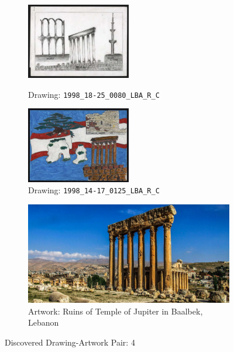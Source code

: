 \begin{figure}
     \centering
     \begin{subfigure}[b]{0.45\textwidth}
         \centering
         \includegraphics[width=0.5\textwidth]{images/new_discoveries/1998_18-25_0080_LBA_R_C.jpg}
         \caption{Drawing: \texttt{1998\_18-25\_0080\_LBA\_R\_C}}
         \label{fig:1998_18-25_0080_LBA_R_C}
         \includegraphics[width=0.5\textwidth]{images/new_discoveries/1998_14-17_0125_LBA_R_C.jpg}
         \caption{Drawing: \texttt{1998\_14-17\_0125\_LBA\_R\_C}}
         \label{fig:1998_14-17_0125_LBA_R_C}
     \end{subfigure}
     \hfill
     \begin{subfigure}[b]{0.45\textwidth}
         \centering
         \hfill
         \includegraphics[width=\textwidth]{images/new_discoveries/baalbek_temple-of-jupiter.jpg}
         \hfill
         \caption{Artwork: Ruins of Temple of Jupiter in Baalbek, Lebanon}
         \label{fig:baalbek_temple-of-jupiter}
     \end{subfigure}
     \caption{Discovered Drawing-Artwork Pair: 4}
\end{figure}



